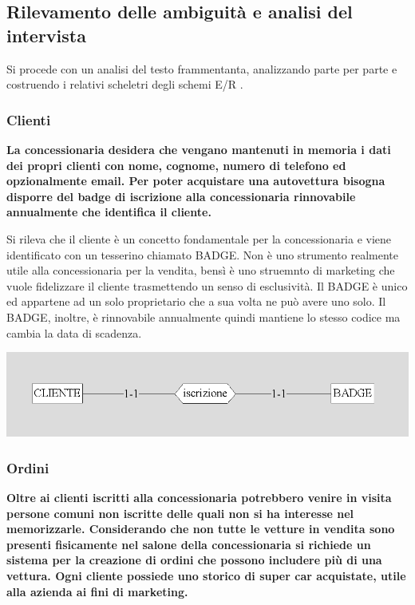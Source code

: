 \documentclass[11pt]{article}
\begin{document}
\subsection{Rilevamento delle ambiguità e analisi del intervista} 

Si procede con un analisi del testo frammentanta, analizzando parte per parte e
costruendo i relativi scheletri degli schemi E/R .

\subsubsection{Clienti}
\textbf{La concessionaria desidera che vengano mantenuti in memoria i dati dei
propri clienti con nome, cognome, numero di telefono ed opzionalmente email. Per
poter acquistare una autovettura bisogna disporre del badge di iscrizione alla
concessionaria rinnovabile annualmente che identifica il cliente.}

Si rileva che il cliente è un concetto fondamentale per la concessionaria e
viene identificato con un tesserino chiamato BADGE. Non è uno strumento
realmente utile alla concessionaria per la vendita, bensì è uno struemnto di
marketing che vuole fidelizzare il cliente trasmettendo un senso di esclusività.
Il BADGE è unico ed appartene ad un solo proprietario che a sua volta ne può
avere uno solo. Il BADGE, inoltre, è rinnovabile annualmente quindi mantiene lo
stesso codice ma cambia la data di scadenza.

\begin{center}
    \includegraphics[width=\linewidth]{images/cliente.png}
\end{center}

\subsubsection{Ordini}
\textbf{Oltre ai clienti iscritti alla concessionaria potrebbero venire in
visita persone comuni non iscritte delle quali non si ha interesse nel
memorizzarle. Considerando che non tutte le vetture in vendita sono presenti
fisicamente nel salone della concessionaria si richiede un sistema per la
creazione di ordini che possono includere più di una vettura. Ogni cliente
possiede uno storico di super car acquistate, utile alla azienda ai fini di
marketing.}
\end{document}
